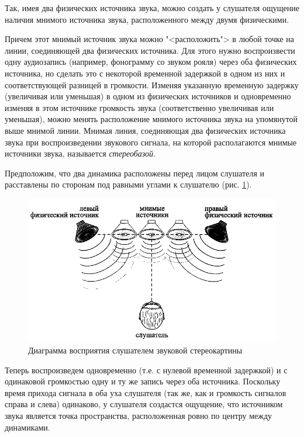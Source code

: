 \documentclass[oneside, final, 14pt]{extreport}
\begin{document}
Так, имея два физических источника звука, можно создать у слушателя ощущение наличия мнимого источника звука, расположенного между двумя физическими.

Причем этот мнимый источник звука можно "<расположить"> в любой точке на линии, соединяющей два физических источника. Для этого нужно воспроизвести одну аудиозапись (например, фонограмму со звуком рояля) через оба физических источника, но сделать это с некоторой временной задержкой в одном из них и соответствующей разницей в громкости. Изменяя указанную временную задержку (увеличивая или уменьшая) в одном из физических источников и одновременно изменяя в этом источнике громкость звука (соответственно увеличивая или уменьшая), можно менять расположение мнимого источника звука на упомянутой выше мнимой линии. Мнимая линия, соединяющая два физических источника звука при воспроизведении звукового сигнала, на которой располагаются мнимые источники звука, называется {\itshape стереобазой}.

Предположим, что два динамика расположены перед лицом слушателя и расставлены по сторонам под равными углами к слушателю (рис. \ref{pic-ear-15}).

\begin{figure}[h]
\centering
\includegraphics[scale=0.8]{pic-ear-15}
\caption{Диаграмма восприятия слушателем звуковой стереокартины}
\label{pic-ear-15}
\end{figure}

Теперь воспроизведем одновременно (т.е. с нулевой временной задержкой) и с одинаковой громкостью одну и ту же запись через оба источника. Поскольку время прихода сигнала в оба уха слушателя (так же, как и громкость сигналов справа и слева) одинаково, у слушателя создастся ощущение, что источником звука является точка пространства, расположенная ровно по центру между динамиками. 
\end{document}
